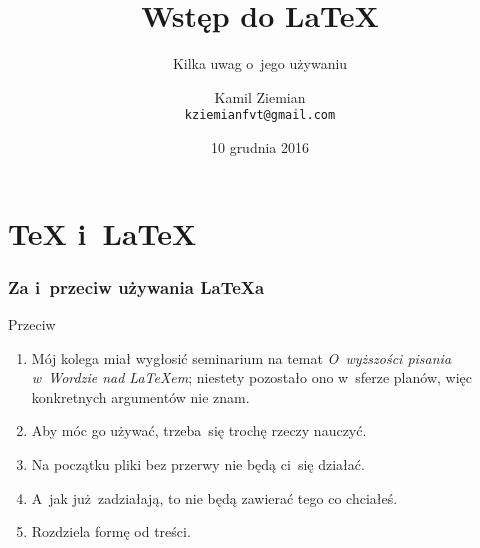 \documentclass[10pt,t]{beamer}
\title{Wstęp do \LaTeX} %
\subtitle{Kilka uwag o~jego używaniu}
\author{Kamil Ziemian \\
  \texttt{kziemianfvt@gmail.com}}
\institute{Uniwersytet Jagielloński w Krakowie}
\date[10 XII 2016]{10 grudnia 2016}
\begin{document}






\RaggedRight





\maketitle %





\section{\TeX{} i~\LaTeX}



\begin{frame}
  \frametitle{Za i~przeciw używania \LaTeX a}


  Przeciw
  \begin{enumerate}
    \RaggedRight

  \item Mój kolega miał wygłosić seminarium na temat
    \textit{O~wyższości pisania w~Wordzie nad \LaTeX em}; niestety
    pozostało ono w~sferze planów, więc konkretnych argumentów nie
    znam.

  \item Aby móc go używać, trzeba~się trochę rzeczy nauczyć.

  \item Na początku pliki bez przerwy nie będą ci~się działać.

  \item A~jak już~zadziałają, to nie będą zawierać tego co chciałeś.

  \item Rozdziela formę od treści.

  \end{enumerate}

\end{frame}
\end{document}

